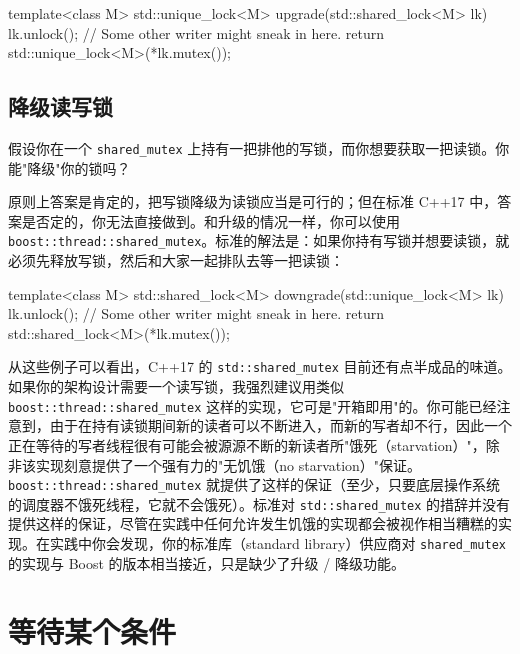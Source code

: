 \begin{codebox}[cpp]
    template<class M>
    std::unique_lock<M> upgrade(std::shared_lock<M> lk)
    {
      lk.unlock();
      // Some other writer might sneak in here.
      return std::unique_lock<M>(*lk.mutex());
    }
\end{codebox}

\subsection{降级读写锁}

假设你在一个 \texttt{shared\_\allowbreak{}mutex} 上持有一把排他的写锁，而你想要获取一把读锁。你能"降级"你的锁吗？

原则上答案是肯定的，把写锁降级为读锁应当是可行的；但在标准 C++17 中，答案是否定的，你无法直接做到。和升级的情况一样，你可以使用 \texttt{boost::\allowbreak{}thread::\allowbreak{}shared\_\allowbreak{}mutex}。标准的解法是：如果你持有写锁并想要读锁，就必须先释放写锁，然后和大家一起排队去等一把读锁：

\begin{codebox}[cpp]
    template<class M>
    std::shared_lock<M> downgrade(std::unique_lock<M> lk)
    {
      lk.unlock();
      // Some other writer might sneak in here.
      return std::shared_lock<M>(*lk.mutex());
    }
\end{codebox}

从这些例子可以看出，C++17 的 \texttt{std::\allowbreak{}shared\_\allowbreak{}mutex} 目前还有点半成品的味道。如果你的架构设计需要一个读写锁，我强烈建议用类似 \texttt{boost::\allowbreak{}thread::\allowbreak{}shared\_\allowbreak{}mutex} 这样的实现，它可是"开箱即用"的。你可能已经注意到，由于在持有读锁期间新的读者可以不断进入，而新的写者却不行，因此一个正在等待的写者线程很有可能会被源源不断的新读者所"饿死（starvation）"，除非该实现刻意提供了一个强有力的"无饥饿（no starvation）"保证。\texttt{boost::\allowbreak{}thread::\allowbreak{}shared\_\allowbreak{}mutex} 就提供了这样的保证（至少，只要底层操作系统的调度器不饿死线程，它就不会饿死）。标准对 \texttt{std::\allowbreak{}shared\_\allowbreak{}mutex} 的措辞并没有提供这样的保证，尽管在实践中任何允许发生饥饿的实现都会被视作相当糟糕的实现。在实践中你会发现，你的标准库（standard library）供应商对 \texttt{shared\_\allowbreak{}mutex} 的实现与 Boost 的版本相当接近，只是缺少了升级 / 降级功能。

\section{等待某个条件}

